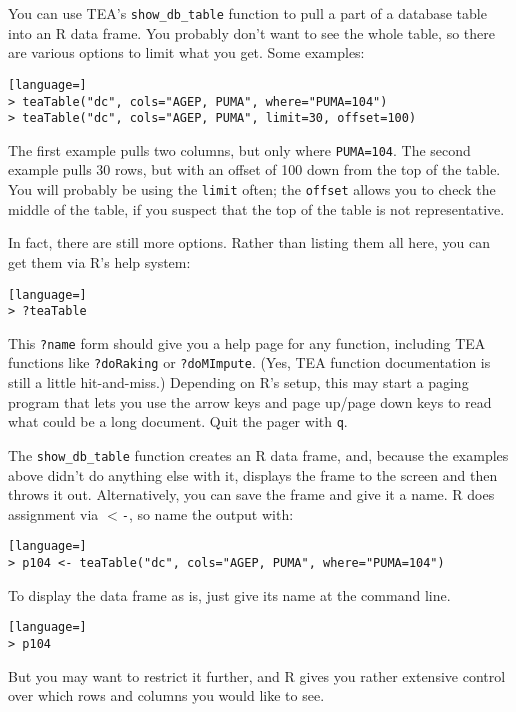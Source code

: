 \documentclass{article}
\begin{document}
You can use TEA's {\tt show\_db\_table} function to pull a part of a database table into
an R data frame. You probably don't want to see the whole table, so there are
various options to limit what you get. Some examples:
\begin{lstlisting}[language=]
> teaTable("dc", cols="AGEP, PUMA", where="PUMA=104")
> teaTable("dc", cols="AGEP, PUMA", limit=30, offset=100)
\end{lstlisting}

The first example pulls two columns, but only where {\tt PUMA=104}. The second
example pulls 30 rows, but with an offset of 100 down from the top of the
table. You will probably be using the {\tt limit} often; the {\tt offset} allows
you to check the middle of the table, if you suspect that the top of the table
is not representative.

In fact, there are still more options. Rather than listing them all here, you can get them
via R's help system:
\begin{lstlisting}[language=]
> ?teaTable
\end{lstlisting}

This {\tt ?name} form should give you a help page for any function, including TEA
functions like {\tt ?doRaking} or {\tt ?doMImpute}. (Yes, TEA function documentation is still a
little hit-and-miss.) Depending on R's setup, this may start a paging program that lets 
you use the arrow keys and page up/page down keys to read what could be a long document. 
Quit the pager with {\tt q}.

The {\tt show\_db\_table} function creates an R data frame, and, because the examples above didn't do
anything else with it, displays the frame to the screen and then throws it out. Alternatively, you can
save the frame and give it a name. R does assignment via {\tt $<$-}, so name the output
with:

\begin{lstlisting}[language=]
> p104 <- teaTable("dc", cols="AGEP, PUMA", where="PUMA=104")
\end{lstlisting}

To display the data frame as is, just give its name at the command line.

\begin{lstlisting}[language=]
> p104
\end{lstlisting}

But you may want to restrict it further, and R gives you rather extensive control over
which rows and columns you would like to see.
\end{document}
